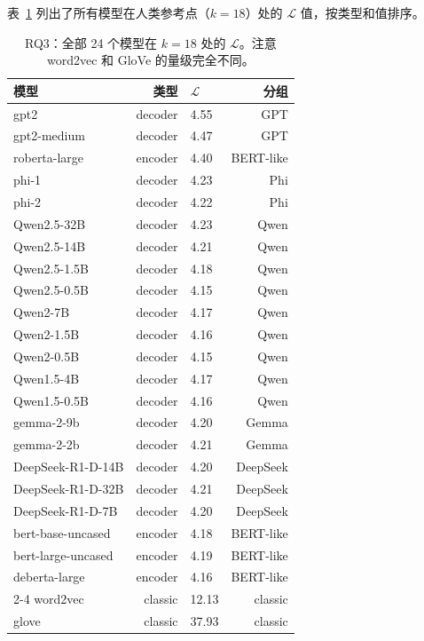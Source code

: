 \documentclass[11pt,a4paper]{article}
\begin{document}
表~\ref{tab:rq3} 列出了所有模型在人类参考点（$k=18$）处的 $\mathcal{L}$ 值，按类型和值排序。

\begin{table}[H]\centering\small
\begin{tabular}{lrlr}
\toprule
\textbf{模型} & \textbf{类型} & \textbf{$\mathcal{L}$} & \textbf{分组}\\
\midrule
gpt2 & decoder & 4.55 & GPT \\
gpt2-medium & decoder & 4.47 & GPT \\
roberta-large & encoder & 4.40 & BERT-like \\
phi-1 & decoder & 4.23 & Phi \\
phi-2 & decoder & 4.22 & Phi \\
Qwen2.5-32B & decoder & 4.23 & Qwen \\
Qwen2.5-14B & decoder & 4.21 & Qwen \\
Qwen2.5-1.5B & decoder & 4.18 & Qwen \\
Qwen2.5-0.5B & decoder & 4.15 & Qwen \\
Qwen2-7B & decoder & 4.17 & Qwen \\
Qwen2-1.5B & decoder & 4.16 & Qwen \\
Qwen2-0.5B & decoder & 4.15 & Qwen \\
Qwen1.5-4B & decoder & 4.17 & Qwen \\
Qwen1.5-0.5B & decoder & 4.16 & Qwen \\
gemma-2-9b & decoder & 4.20 & Gemma \\
gemma-2-2b & decoder & 4.21 & Gemma \\
DeepSeek-R1-D-14B & decoder & 4.20 & DeepSeek \\
DeepSeek-R1-D-32B & decoder & 4.21 & DeepSeek \\
DeepSeek-R1-D-7B & decoder & 4.20 & DeepSeek \\
bert-base-uncased & encoder & 4.18 & BERT-like \\
bert-large-uncased & encoder & 4.19 & BERT-like \\
deberta-large & encoder & 4.16 & BERT-like \\
\cmidrule{2-4}
word2vec & classic & 12.13 & classic \\
glove & classic & 37.93 & classic \\
\bottomrule
\end{tabular}
\caption{RQ3：全部 24 个模型在 $k=18$ 处的 $\mathcal{L}$。注意 word2vec 和 GloVe 的量级完全不同。}
\label{tab:rq3}
\end{table}
\end{document}

